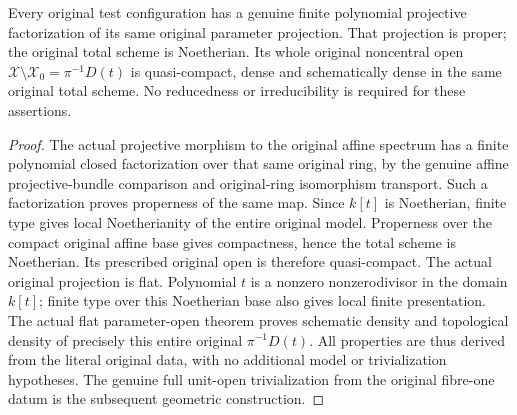 \begin{lemma}
\label{lem:native-test-configuration-model-geometry}
\leanok
{}
Every original test configuration has a genuine finite polynomial
projective factorization of its same original parameter projection.
That projection is proper; the original total scheme is
Noetherian. Its whole original noncentral open
$\mathcal X\setminus\mathcal X_0=\pi^{-1}D(t)$ is quasi-compact,
dense and schematically dense in the same original total scheme.
No reducedness or irreducibility is required for these assertions.
\end{lemma}
\begin{proof}
The actual projective morphism to the original affine spectrum
has a finite polynomial closed factorization over that same
original ring, by the genuine affine projective-bundle
comparison and original-ring isomorphism transport. Such a
factorization proves properness of the same map. Since
$k[t]$ is Noetherian, finite type gives local Noetherianity
of the entire original model. Properness over the compact
original affine base gives compactness, hence the total
scheme is Noetherian. Its prescribed original open is
therefore quasi-compact.
The actual original projection is flat. Polynomial $t$ is a
nonzero nonzerodivisor in the domain $k[t]$; finite type over
this Noetherian base also gives local finite presentation.
The actual flat parameter-open theorem proves schematic
density and topological density of precisely this entire
original $\pi^{-1}D(t)$. All properties are thus derived
from the literal original data, with no additional model
or trivialization hypotheses. The genuine full unit-open
trivialization from the original fibre-one datum is the
subsequent geometric construction.
\end{proof}
